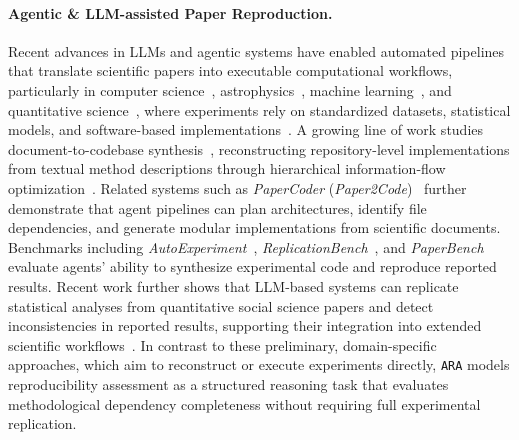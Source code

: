 \documentclass{article}
\begin{document}
\paragraph{Agentic \& LLM-assisted Paper Reproduction.}
Recent advances in LLMs and agentic systems have enabled automated pipelines that translate scientific papers into executable computational workflows, particularly in computer science~\citep{seo2025paper2code,li2025deepcode}, astrophysics~\citep{ye2025replicationbench}, machine learning~\citep{starace2025paperbench}, and quantitative science~\citep{kubota2026llm}, where experiments rely on standardized datasets, statistical models, and software-based implementations~\citep{kubota2026llm}. 
A growing line of work studies document-to-codebase synthesis~\citep{li2025deepcode}, reconstructing repository-level implementations from textual method descriptions through hierarchical information-flow optimization~\citep{li2025deepcode}. 
Related systems such as \textit{PaperCoder} (\textit{Paper2Code})~\citep{seo2025paper2code} further demonstrate that agent pipelines can plan architectures, identify file dependencies, and generate modular implementations from scientific documents. 
Benchmarks including \textit{AutoExperiment}~\citep{kim2025reproduction}, \textit{ReplicationBench}~\citep{ye2025replicationbench}, and \textit{PaperBench}~\citep{starace2025paperbench} evaluate agents’ ability to synthesize experimental code and reproduce reported results. 
Recent work further shows that LLM-based systems can replicate statistical analyses from quantitative social science papers and detect inconsistencies in reported results, supporting their integration into extended scientific workflows~\citep{kubota2026llm,kubota2026llm2,ye2025replicationbench}. 
In contrast to these preliminary, domain-specific approaches, which aim to reconstruct or execute experiments directly, \texttt{ARA} models reproducibility assessment as a structured reasoning task that evaluates methodological dependency completeness without requiring full experimental replication.
\end{document}
